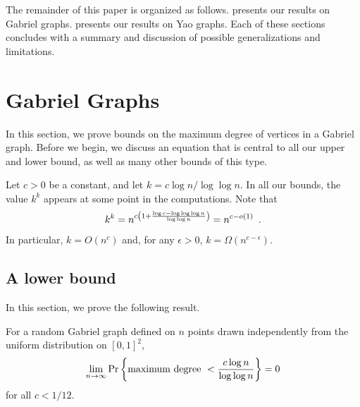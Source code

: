 \documentclass[lotsofwhite,charterfonts]{patmorin}
\newcommand{\PROB}{\Pr}
\begin{document}
The remainder of this paper is organized as follows.  
presents our results on Gabriel graphs.   presents our
results on Yao graphs.  Each of these sections concludes with a summary
and discussion of possible generalizations and limitations.

\section{Gabriel Graphs}


In this section, we prove bounds on the maximum degree of vertices in a
Gabriel graph.  Before we begin, we discuss an equation that is central to
all our upper and lower bound, as well as many other bounds of this type.

Let $c>0$ be a constant, and let $k=c\log n/\log\log n$.  In all our
bounds, the value $k^k$ appears at some point in the computations.  Note that
\begin{equation}
    k^k = n^{c\left(1+\frac{\log c - \log\log\log n}{\log\log n}\right)} = n^{c-o(1)}
   \enspace . \eqlabel{central}
\end{equation}
In particular, $k=O(n^c)$ and, for any $\epsilon >0$,
$k=\Omega(n^{c-\epsilon})$.  


\subsection{A lower bound}

In this section, we prove the following result.

\begin{thm}
For a random Gabriel graph defined on $n$ points drawn
independently from the uniform distribution on
$[0,1]^2$, 
\[
\lim_{n\to\infty} \PROB \left\{ \hbox{\rm maximum degree}~< {c \log n \over
\log \log n} \right\} = 0
\]
for all $c < 1/12$.
\end{thm}
\end{document}
